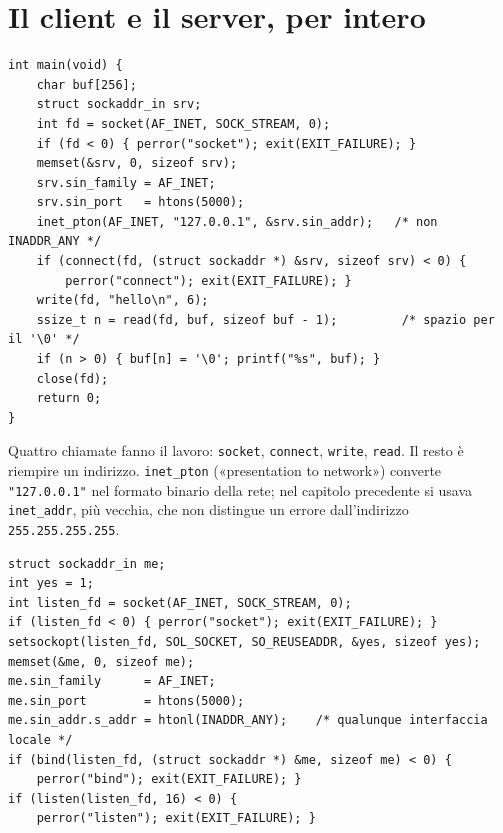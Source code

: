 
\section{Il client e il server, per intero}

\begin{lstlisting}[language={[POSIX]C}, style=wnumbers, title={client.c}]
int main(void) {
    char buf[256];
    struct sockaddr_in srv;
    int fd = socket(AF_INET, SOCK_STREAM, 0);
    if (fd < 0) { perror("socket"); exit(EXIT_FAILURE); }
    memset(&srv, 0, sizeof srv);
    srv.sin_family = AF_INET;
    srv.sin_port   = htons(5000);
    inet_pton(AF_INET, "127.0.0.1", &srv.sin_addr);   /* non INADDR_ANY */
    if (connect(fd, (struct sockaddr *) &srv, sizeof srv) < 0) {
        perror("connect"); exit(EXIT_FAILURE); }
    write(fd, "hello\n", 6);
    ssize_t n = read(fd, buf, sizeof buf - 1);         /* spazio per il '\0' */
    if (n > 0) { buf[n] = '\0'; printf("%s", buf); }
    close(fd);
    return 0;
}
\end{lstlisting}

Quattro chiamate fanno il lavoro: \texttt{socket}, \texttt{connect}, \texttt{write}, \texttt{read}. Il resto è riempire
un indirizzo. \texttt{inet\_pton} («presentation to network») converte \texttt{"127.0.0.1"} nel formato binario della
rete; nel capitolo precedente si usava \texttt{inet\_addr}, più vecchia, che non distingue un errore dall'indirizzo
\texttt{255.255.255.255}.

\begin{lstlisting}[language={[POSIX]C}, style=wnumbers, title={server.c: il socket di ascolto}]
struct sockaddr_in me;
int yes = 1;
int listen_fd = socket(AF_INET, SOCK_STREAM, 0);
if (listen_fd < 0) { perror("socket"); exit(EXIT_FAILURE); }
setsockopt(listen_fd, SOL_SOCKET, SO_REUSEADDR, &yes, sizeof yes);
memset(&me, 0, sizeof me);
me.sin_family      = AF_INET;
me.sin_port        = htons(5000);
me.sin_addr.s_addr = htonl(INADDR_ANY);    /* qualunque interfaccia locale */
if (bind(listen_fd, (struct sockaddr *) &me, sizeof me) < 0) {
    perror("bind"); exit(EXIT_FAILURE); }
if (listen(listen_fd, 16) < 0) {
    perror("listen"); exit(EXIT_FAILURE); }
\end{lstlisting}

